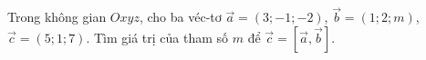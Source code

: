 \begin{bt}%
	Trong không gian $Oxyz$, cho ba véc-tơ $\overrightarrow{a}= (3; -1; -2)$, $\overrightarrow{b}= (1; 2; m)$, $\overrightarrow{c}= (5; 1; 7)$. Tìm giá trị của tham số $m$ để $\overrightarrow{c}= \left[ \overrightarrow{a}, \overrightarrow{b}\right]$.
\end{bt}
